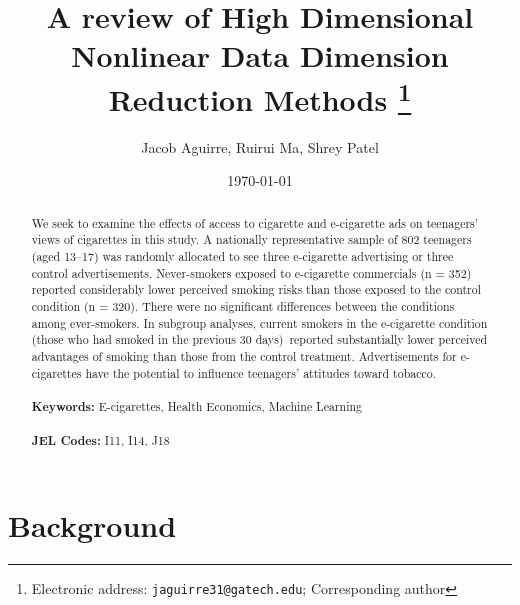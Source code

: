 \documentclass[12pt]{article}
\begin{document}
\begin{titlepage}
\title{A review of High Dimensional Nonlinear Data Dimension Reduction Methods
\thanks{Electronic address: \texttt{jaguirre31@gatech.edu}; Corresponding author}}
\author{Jacob Aguirre, Ruirui Ma, Shrey Patel}
\date{\today}
\maketitle
\begin{abstract}
\noindent  We seek to examine the effects of access to cigarette and e-cigarette ads on teenagers' views of cigarettes in this study. A nationally representative sample of 802 teenagers (aged 13–17) was randomly allocated to see three e-cigarette advertising or three control advertisements. Never-smokers exposed to e-cigarette commercials (n = 352) reported considerably lower perceived smoking risks than those exposed to the control condition (n = 320). There were no significant differences between the conditions among ever-smokers. In subgroup analyses, current smokers in the e-cigarette condition (those who had smoked in the previous 30 days) reported substantially lower perceived advantages of smoking than those from the control treatment. Advertisements for e-cigarettes have the potential to influence teenagers' attitudes toward tobacco. \\
\vspace{0in}\\
\noindent\textbf{Keywords:} E-cigarettes, Health Economics, Machine Learning\\
\vspace{0in}\\
\noindent\textbf{JEL Codes:} I11, I14, J18\\

\bigskip
\end{abstract}
\setcounter{page}{0}
\thispagestyle{empty}
\end{titlepage}
\pagebreak \newpage




\doublespacing


\section{Background} \label{sec:introduction}
\end{document}
